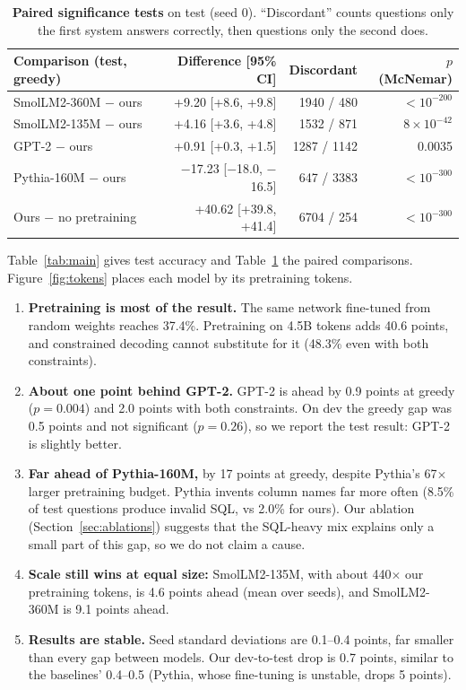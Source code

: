 \documentclass[11pt]{article}
\begin{document}
\begin{table}[t]
\centering
\small
\begin{tabular}{lrrr}
\toprule
Comparison (test, greedy) & Difference [95\% CI] & Discordant & $p$ (McNemar) \\
\midrule
SmolLM2-360M $-$ ours & +9.20 [+8.6, +9.8] & 1940 / 480 & $<10^{-200}$ \\
SmolLM2-135M $-$ ours & +4.16 [+3.6, +4.8] & 1532 / 871 & $8\times10^{-42}$ \\
GPT-2 $-$ ours & +0.91 [+0.3, +1.5] & 1287 / 1142 & 0.0035 \\
Pythia-160M $-$ ours & $-$17.23 [$-$18.0, $-$16.5] & 647 / 3383 & $<10^{-300}$ \\
Ours $-$ no pretraining & +40.62 [+39.8, +41.4] & 6704 / 254 & $<10^{-300}$ \\
\bottomrule
\end{tabular}
\caption{\textbf{Paired significance tests} on test (seed 0). ``Discordant'' counts questions only the first system answers correctly, then questions only the second does.}
\label{tab:paired}
\end{table}

Table~\ref{tab:main} gives test accuracy and Table~\ref{tab:paired} the paired comparisons. Figure~\ref{fig:tokens} places each model by its pretraining tokens.

\begin{enumerate}
  \item \textbf{Pretraining is most of the result.} The same network fine-tuned from random weights reaches 37.4\%. Pretraining on 4.5B tokens adds 40.6 points, and constrained decoding cannot substitute for it (48.3\% even with both constraints).
  \item \textbf{About one point behind GPT-2.} GPT-2 is ahead by 0.9 points at greedy ($p = 0.004$) and 2.0 points with both constraints. On dev the greedy gap was 0.5 points and not significant ($p = 0.26$), so we report the test result: GPT-2 is slightly better.
  \item \textbf{Far ahead of Pythia-160M,} by 17 points at greedy, despite Pythia's 67$\times$ larger pretraining budget. Pythia invents column names far more often (8.5\% of test questions produce invalid SQL, vs 2.0\% for ours). Our ablation (Section~\ref{sec:ablations}) suggests that the SQL-heavy mix explains only a small part of this gap, so we do not claim a cause.
  \item \textbf{Scale still wins at equal size:} SmolLM2-135M, with about 440$\times$ our pretraining tokens, is 4.6 points ahead (mean over seeds), and SmolLM2-360M is 9.1 points ahead.
  \item \textbf{Results are stable.} Seed standard deviations are 0.1--0.4 points, far smaller than every gap between models. Our dev-to-test drop is 0.7 points, similar to the baselines' 0.4--0.5 (Pythia, whose fine-tuning is unstable, drops 5 points).
\end{enumerate}
\end{document}
